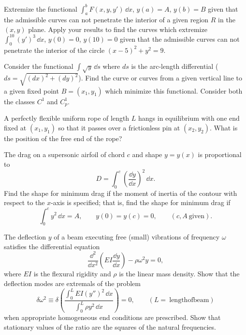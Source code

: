\begin{Exercise}
  Extremize the functional $\int_a^b F(x,y,y')\,\dd x$, $y(a) = A$, 
  $y(b) = B$ given that the admissible curves can not penetrate the 
  interior of a given region $R$ in the $(x,y)$ plane.  Apply your results
  to find the curves which extremize $\int_0^{10} (y')^3 \,\dd x$,
  $y(0) = 0$, $y(10) = 0$ given that the admissible curves can not
  penetrate the interior of the circle $(x-5)^2 + y^2 = 9$.
\end{Exercise}



\begin{Exercise}
  Consider the functional $\int \sqrt{y} \,\dd s$ where $d s$ is the 
  arc-length differential ($d s = \sqrt{(d x)^2 + (d y)^2}$).  Find the
  curve or curves from a given vertical line to a given fixed point
  $B = (x_1,y_1)$ which minimize this functional.  Consider both the
  classes $C^1$ and $C^1_p$.
\end{Exercise}



\begin{Exercise}
  A perfectly flexible uniform rope of length $L$ hangs in equilibrium 
  with one end fixed at $(x_1, y_1)$ so that it passes over a 
  frictionless pin at $(x_2, y_2)$.  What is the position of the free end of the
  rope?
\end{Exercise}



\begin{Exercise}
  The drag on a supersonic airfoil of chord $c$ and shape $y = y(x)$ is 
  proportional to
  \[
  D = \int_0^c \left( \frac{\dd y}{\dd x} \right)^2 \,\dd x.
  \]
  Find the shape for minimum drag if the moment of inertia of the 
  contour with respect to the $x$-axis is specified;  that is, find the
  shape for minimum drag if
  \[
  \int_0^c y^2 \,\dd x = A, \qquad
  y(0) = y(c) = 0, \qquad
  (c, A\ \mathrm{given}).
  \]
\end{Exercise}



\begin{Exercise}
  The deflection $y$ of a beam executing free (small) vibrations of 
  frequency $\omega$ satisfies the differential equation
  \[
  \frac{\dd^2}{\dd x^2} \left( E I \frac{\dd y}{\dd x} \right) - \rho \omega^2 y = 0,
  \]
  where $E I$ is the flexural rigidity and $\rho$ is the linear mass density.
  Show that the deflection modes are extremals of the problem
  \[
  \delta \omega^2 \equiv 
  \delta \left( \frac{\int_0^L E I (y'')^2 \,\dd x}{\int_0^L \rho y^2 \,\dd x }
  \right) = 0, \qquad
  (L =\ \mathrm{length of beam})
  \]
  when appropriate homogeneous end conditions are prescribed. Show that
  stationary values of the ratio are the squares of the natural frequencies.
\end{Exercise}



